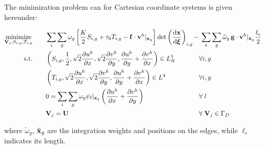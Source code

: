 \documentclass[11 pt]{report}
\begin{document}
\pagebreak
The minimization problem can for Cartesian coordinate systems is given hereunder:%
\begin{empheqboxed}
    \begin{equation}
        \begin{alignedat}{3}
            \operatorname*{minimize}_{\mathbf{V}_j, S_{i,g}, T_{i,g}} &\qquad \sum_{i}\sum_{g} \omega_g \left[\frac{K}{2} S_{i,g} + \tau_0 T_{i,g} - \mathbf{f} \cdot \mathbf{v}^h \vert_{\mathbf{x}_g} \right] \det \left(\dv{\mathbf{x}}{\boldsymbol \xi}\right)_{i,g}
            - && \: \sum_{e}\sum_{g} \tilde \omega_g \,\mathbf{g}\cdot \mathbf{v}^h\vert_{\tilde {\mathbf{x}}_g} \frac{\ell_{\text{e}}}{2}\\
            \textrm{s.t.} &\qquad \left(S_{i,g}, \frac{1}{2}, \sqrt{2}\pdv{u^h}{x}, \sqrt{2}\pdv{v^h}{y}, \pdv{u^h}{y}+\pdv{v^h}{x}\right) \in L_R^5 && \forall i, g\\
            &\qquad \left(T_{i,g}, \sqrt{2}\pdv{u^h}{x}, \sqrt{2}\pdv{v^h}{y}, \pdv{u^h}{y}+\pdv{v^h}{x}\right) \in L^4 && \forall i, g\\
            &\qquad 0 = \sum_i \sum_g \omega_g \psi_l \vert_{\mathbf{x}_g} \left(\pdv{u^h}{x} + \pdv{v^h}{y}\right) && \forall\; l\\
            &\qquad \mathbf{V}_{j} = \mathbf{U} && \forall\; \mathbf{V}_{j} \in \Gamma_D
        \end{alignedat}
        \label{eq:functional2D}
    \end{equation}
\end{empheqboxed}
where $\tilde \omega_g$, $\tilde {\mathbf{x}}_g$ are the integration weights and positions on the edges, while $\ell_e$ indicates its length.
\end{document}
